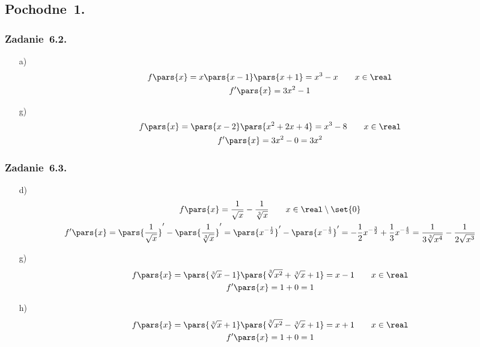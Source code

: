 \subsection*{Pochodne~1.}
\subsubsection*{Zadanie~6.2.}
\begin{itemize}
    \item[a)]
        \begin{gather*}
            f\pars{x} = x\pars{x - 1}\pars{x + 1} = x^3 - x \qquad x \in \real\\
            f'\pars{x} = 3x^2 - 1
        \end{gather*}
    \item[g)]
        \begin{gather*}
            f\pars{x} = \pars{x - 2}\pars{x^2 + 2x + 4} = x^3 - 8 \qquad x \in \real\\
            f'\pars{x} = 3x^2 - 0 = 3x^2
        \end{gather*}
\end{itemize}
\subsubsection*{Zadanie~6.3.}
\begin{itemize}
    \item[d)]
        \begin{gather*}
            f\pars{x} = \frac{1}{\sqrt{x}} - \frac{1}{\sqrt[3]{x}} \qquad x \in \real \setminus \set{0}\\
            f'\pars{x}
                = \pars{\frac{1}{\sqrt{x}}}' - \pars{\frac{1}{\sqrt[3]{x}}}'
                = \pars{x^{-\frac{1}{2}}}' - \pars{x^{-\frac{1}{3}}}'
                = -\frac{1}{2}x^{-\frac{3}{2}} + \frac{1}{3}x^{-\frac{4}{3}}
                = \frac{1}{3\sqrt[3]{x^4}} - \frac{1}{2\sqrt{x^3}}
        \end{gather*}
    \item[g)]
        \begin{gather*}
            f\pars{x} = \pars{\sqrt[3]{x} - 1}\pars{\sqrt[3]{x^2} + \sqrt[3]{x} + 1} = x - 1 \qquad x \in \real\\
            f'\pars{x} = 1 + 0 = 1
        \end{gather*}
    \item[h)]
        \begin{gather*}
            f\pars{x} = \pars{\sqrt[3]{x} + 1}\pars{\sqrt[3]{x^2} - \sqrt[3]{x} + 1} = x + 1 \qquad x \in \real\\
            f'\pars{x} = 1 + 0 = 1
        \end{gather*}
\end{itemize}
